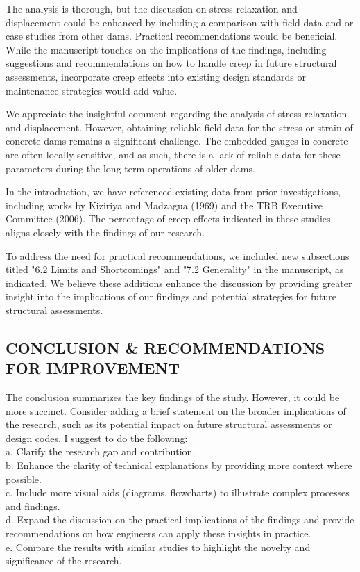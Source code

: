 \documentclass{ar2rc}
\begin{document}
{	\RC The analysis is thorough, but the discussion on stress relaxation and displacement could be enhanced by including a comparison with field data and or case studies from other dams. Practical recommendations would be beneficial. While the manuscript touches on the implications of the findings, including suggestions and recommendations on how to handle creep
	in future structural assessments, incorporate creep effects into existing design standards or maintenance strategies would add value.
	
	\AR We appreciate the insightful comment regarding the analysis of stress relaxation and displacement. However, obtaining reliable field data for the stress or strain of concrete dams remains a significant challenge. The embedded gauges in concrete are often locally sensitive, and as such, there is a lack of reliable data for these parameters during the long-term operations of older dams.

	In the introduction, we have referenced existing data from prior investigations, including works by Kiziriya and Madzagua (1969) and the TRB Executive Committee (2006). The percentage of creep effects indicated in these studies aligns closely with the findings of our research.

	To address the need for practical recommendations, we included new subsections titled "6.2 Limits and Shortcomings" and "7.2 Generality" in the manuscript, as indicated. We believe these additions enhance the discussion by providing greater insight into the implications of our findings and potential strategies for future structural assessments.
	   
	
	
	\subsection{CONCLUSION \& RECOMMENDATIONS FOR IMPROVEMENT}
	\RC The conclusion summarizes the key findings of the study. However, it could be more succinct. Consider adding a brief statement on the broader implications of the research, such as its potential impact on future structural assessments or design codes. I suggest to do the following:\\
	a. Clarify the research gap and contribution.\\
	b. Enhance the clarity of technical explanations by providing more context where possible.\\
	c. Include more visual aids (diagrams, flowcharts) to illustrate complex processes and findings.\\
	d. Expand the discussion on the practical implications of the findings and provide recommendations on how engineers can apply these insights in practice.\\
	e. Compare the results with similar studies to highlight the novelty and significance of the research.
	
}
\end{document}
